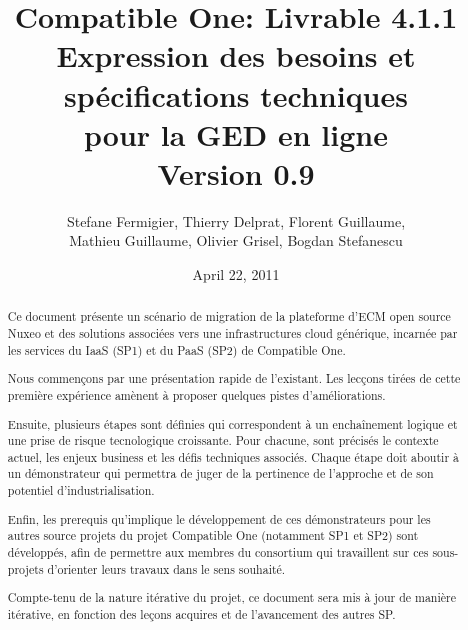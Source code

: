 \documentclass[a4paper,11pt]{article}
\title{Compatible One: Livrable 4.1.1\\
Expression des besoins et spécifications techniques\\
pour la GED en ligne\\
Version 0.9}
\date{April 22, 2011}
\author{Stefane Fermigier, Thierry Delprat, Florent Guillaume,\\
Mathieu Guillaume, Olivier Grisel, Bogdan Stefanescu}
\begin{document}
\maketitle

\begin{abstract}
  Ce document présente un scénario de migration de la plateforme d'ECM open source Nuxeo et des solutions associées vers une infrastructures cloud générique, incarnée par les services du IaaS (SP1) et du PaaS (SP2) de Compatible One.
  
  Nous commençons par une présentation rapide de l'existant. Les lecçons tirées de cette première expérience amènent à proposer quelques pistes d'améliorations.
  
  Ensuite, plusieurs étapes sont définies qui correspondent à un enchaînement logique et une prise de risque tecnologique croissante. Pour chacune, sont précisés le contexte actuel, les enjeux business et les défis techniques associés. Chaque étape doit aboutir à un démonstrateur qui permettra de juger de la pertinence de l'approche et de son potentiel d'industrialisation.
  
  Enfin, les prerequis qu'implique le développement de ces démonstrateurs pour les autres source projets du projet Compatible One (notamment SP1 et SP2) sont développés, afin de permettre aux membres du consortium qui travaillent sur ces sous-projets d'orienter leurs travaux dans le sens souhaité.

  Compte-tenu de la nature itérative du projet, ce document sera mis à jour de manière itérative, en fonction des leçons acquires et de l'avancement des autres SP.
\end{abstract}

\tableofcontents

\pagebreak




\end{document}
